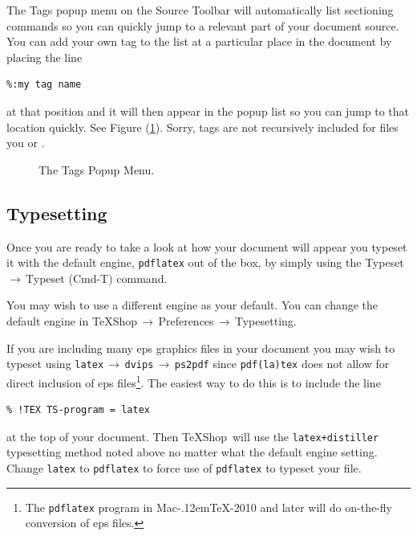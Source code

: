 \documentclass[letterpaper,11pt]{article}
\newcommand{\MacTeX}{Mac\kern-.12em\TeX}
\newcommand{\TS}{\textsf{\TeX Shop}}
\newcommand{\acr}[1]{\textsf{#1}}
\newcommand{\cmd}[1]{\textsf{#1}}
\newcommand{\mnu}[1]{\textsf{#1}}
\newcommand{\To}{\,\(\to\)\,}
\begin{document}
The \mnu{Tags} popup menu on the Source Toolbar will automatically list sectioning commands so you can quickly jump to a relevant part of your document source. You can add your own tag to the list at a particular place in the document by placing the line
\begin{verbatim}
%:my tag name
\end{verbatim}
at that position and it will then appear in the popup list so you can jump to that location quickly. See Figure (\ref{fig:Tags}). Sorry, tags are not recursively included for files you \verb|| or \verb||.
\begin{figure}
\centering
{}
\caption{The Tags Popup Menu.}
\label{fig:Tags}
\end{figure}

\subsection{Typesetting}

Once you are ready to take a look at how your document will appear you typeset it with the default engine, \texttt{pdflatex} out of the box, by simply using the \mnu{Typeset}\To\mnu{Typeset} (\cmd{Cmd-T}) command.

You may wish to use a different engine as your default. You can change the default engine in \mnu{TeXShop}\To\mnu{Preferences}\To\mnu{Typesetting}.

If you are including many \acr{eps} graphics files in your document you may wish to typeset using \texttt{latex}\To\texttt{dvips}\To\texttt{ps2pdf} since \texttt{pdf(la)tex} does not allow for direct inclusion of \acr{eps} files\footnote{The \texttt{pdflatex} program in \MacTeX-2010 and later will do on-the-fly conversion of \acr{eps} files.}. The easiest way to do this is to include the line
\begin{verbatim}
% !TEX TS-program = latex
\end{verbatim}
at the top of your document. Then \TS\ will use the \texttt{latex+distiller} typesetting method noted above no matter what the default engine setting. Change \texttt{latex} to \texttt{pdflatex} to force use of \texttt{pdflatex} to typeset your file.
\end{document}
